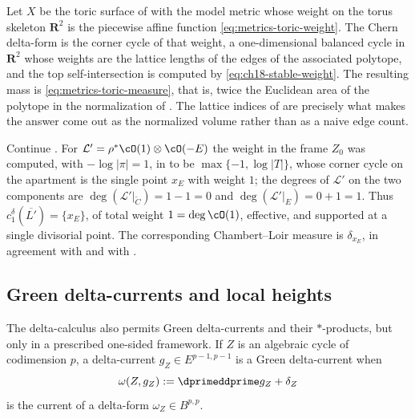 \begin{example}
\label{ex:ch18-toric-delta}
Let $X$ be the toric surface of  with the
model metric whose weight on the torus skeleton $\mathbf R^2$ is the piecewise
affine function \eqref{eq:metrics-toric-weight}.  The Chern delta-form is
the corner cycle of that weight, a one-dimensional balanced cycle in
$\mathbf R^2$ whose weights are the lattice lengths of the edges of the
associated polytope, and the top self-intersection is computed by
\eqref{eq:ch18-stable-weight}.  The resulting mass is
\eqref{eq:metrics-toric-measure}, that is, twice the Euclidean area of the
polytope in the normalization of .  The lattice indices
of  are precisely what makes the answer come out
as the normalized volume rather than as a naive edge count.
\end{example}

\begin{example}
\label{ex:ch18-p1-blowup-delta}
Continue .  For
$\mathcal L'=\rho^*\cO(1)\otimes\cO(-E)$ the weight in the frame $Z_0$ was
computed, with $-\log|\pi|=1$, in  to be
$\max\{-1,\log|T|\}$, whose
corner cycle on the apartment is the single point $x_E$ with weight $1$;
the degrees of $\mathcal L'$ on the two components are
$\deg(\mathcal L'|_{\widetilde C})=1-1=0$ and
$\deg(\mathcal L'|_E)=0+1=1$.  Thus
$c_1^\delta(\overline{L'})=\{x_E\}$, of total weight $1=\deg\cO(1)$,
effective, and supported at a single divisorial point.  The corresponding
Chambert--Loir measure is $\delta_{x_E}$, in agreement with
 and with .
\end{example}

\subsection{Green delta-currents and local heights}
\label{sec:ch18-green}

The delta-calculus also permits Green delta-currents and their
$*$-products, but only in a prescribed one-sided framework.  If $Z$ is
an algebraic cycle of codimension $p$, a delta-current
$g_Z\in E^{p-1,p-1}$ is a Green delta-current when
\[
          \omega(Z,g_Z):=\dprimeddprime g_Z+\delta_Z
\]
is the current of a delta-form $\omega_Z\in B^{p,p}$.

